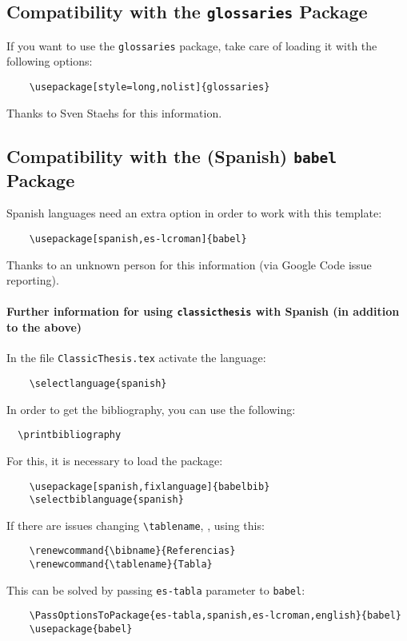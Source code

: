 \subsection*{Compatibility with the \texttt{glossaries} Package}
If you want to use the \texttt{glossaries} package, take care of loading it
with the following options:
\begin{verbatim}
    \usepackage[style=long,nolist]{glossaries}
\end{verbatim}
Thanks to Sven Staehs for this information.


\subsection*{Compatibility with the (Spanish) \texttt{babel} Package}
Spanish languages need an extra option in order to work with this template:
\begin{verbatim}
    \usepackage[spanish,es-lcroman]{babel}
\end{verbatim}
Thanks to an unknown person for this information (via Google Code issue reporting).


\paragraph{Further information for using \texttt{classicthesis} with Spanish (in addition to the above)}
In the file \texttt{ClassicThesis.tex} activate the language:
\begin{verbatim}
    \selectlanguage{spanish}
\end{verbatim}

In order to get the bibliography, you can use the following:
\begin{verbatim}
  \printbibliography
\end{verbatim}

For this, it is necessary to load the package:
\begin{verbatim}
    \usepackage[spanish,fixlanguage]{babelbib}
    \selectbiblanguage{spanish}
\end{verbatim}

If there are issues changing \verb|\tablename|, \eg, using this:
\begin{verbatim}
    \renewcommand{\bibname}{Referencias}
    \renewcommand{\tablename}{Tabla}
\end{verbatim}

This can be solved by passing \texttt{es-tabla} parameter to \texttt{babel}:
\begin{verbatim}
    \PassOptionsToPackage{es-tabla,spanish,es-lcroman,english}{babel}
    \usepackage{babel}
\end{verbatim}

